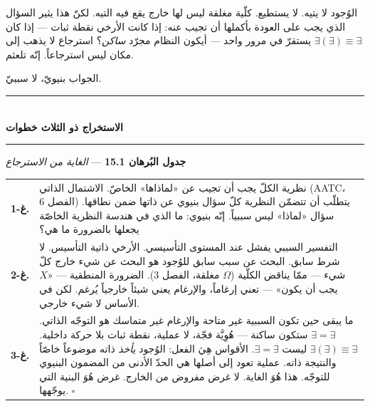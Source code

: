 \documentclass[10pt, openany, oneside]{book}
\renewcommand{\normalsize}{\fontsize{10}{13}\selectfont}
\renewcommand{\footnotesize}{\fontsize{8.5}{11}\selectfont}
\begin{document}
\noindent الوُجود لا يتيه. لا يستطيع. كلّية مغلقة ليس لها خارج يقع فيه التيه. لكنّ هذا يثير السؤال الذي يجب على العودة بأكملها أن تجيب عنه: إذا كانت الأرخي نقطة ثبات --- إذا كان $\exists(\exists) \equiv \exists$ يستقرّ في مرور واحد --- أيكون النظام مجرّد \textit{ساكن}؟ استرجاع لا يذهب إلى مكان ليس استرجاعاً. إنّه تلعثم.

الجواب بنيويّ، لا سببيّ.

\vspace{1.5em}


\begin{center}
    \rule{0.3\textwidth}{0.4pt}\\[0.5em]
    {\normalsize\bfseries الاستخراج ذو الثلاث خطوات}\\[0.3em]
    \rule{0.3\textwidth}{0.4pt}
\end{center}

\vspace{1em}

\textbf{جدول البُرهان 15.1} --- \textit{الغاية من الاسترجاع}

\vspace{0.5em}

{\footnotesize
\noindent\begin{tabular}{r p{}}
\textbf{غ-1.} & نظرية الكلّ يجب أن تجيب عن «لماذاها» الخاصّ. الاشتمال الذاتي (AATC، الفصل 6) يتطلّب أن تتضمّن النظرية كلّ سؤال بنيوي عن ذاتها ضمن نطاقها. سؤال «لماذا» ليس سببياً. إنّه بنيوي: ما الذي في هندسة النظرية الخاصّة يجعلها بالضرورة ما هي؟ \\[0.3em]
\textbf{غ-2.} & التفسير السببي يفشل عند المستوى التأسيسي. الأرخي ذاتية التأسيس. لا شرط سابق. البحث عن سبب سابق للوُجود هو البحث عن شيء خارج كلّ شيء --- ممّا يناقض الكلّية ($\Omega$ مغلقة، الفصل 3). الضرورة المنطقية --- «$X$ يجب أن يكون» --- تعني إرغاماً، والإرغام يعني شيئاً خارجياً يُرغم. لكن في الأساس لا شيء خارجي. \\[0.3em]
\textbf{غ-3.} & ما يبقى حين تكون السببية غير متاحة والإرغام غير متماسك هو التوجّه الذاتي. $\exists = \exists$ ستكون ساكنة --- هُوِيَّة فجّة، لا عملية، نقطة ثبات بلا حركة داخلية. $\exists(\exists) \equiv \exists$ ليست $\exists = \exists$. الأقواس هِيَ الفعل: الوُجود \textit{يأخذ} ذاته موضوعاً خاصّاً والنتيجة ذاته. عملية تعود إلى أصلها هي الحدّ الأدنى من المضمون البنيوي للتوجّه. هذا هُوَ الغاية. لا غرض مفروض من الخارج. غرض هُوَ البنية التي يوجّهها. $\square$ \\[0.3em]
\end{tabular}
}

\vspace{0.8em}
\end{document}
